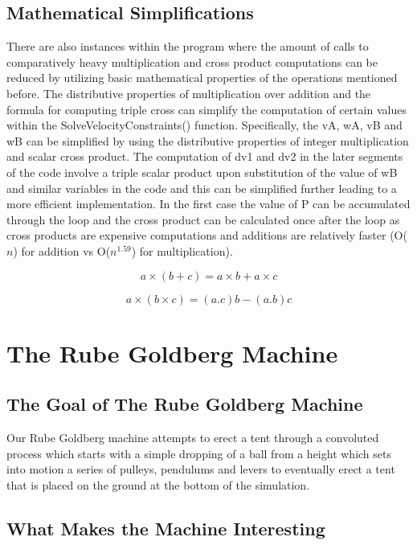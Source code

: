 \documentclass[11pt] {article}
\begin{document}
\subsection {Mathematical Simplifications}

There are also instances within the program where the amount of calls to comparatively heavy multiplication
and cross product computations can be reduced by utilizing basic mathematical properties of the operations
mentioned before. The distributive properties of multiplication over addition and the formula for computing
triple cross can simplify the computation of certain values within the SolveVelocityConstraints() function.
Specifically, the vA, wA, vB and wB can be simplified by using the distributive properties of integer
multiplication and scalar cross product. The computation of dv1 and dv2 in the later segments of the code
involve a triple scalar product upon substitution of the value of wB and similar variables in the code and
this can be simplified further leading to a more efficient implementation. In the first case the value of
P can be accumulated through the loop and the cross product can be calculated once after the loop as cross
products are expensive computations and additions are relatively faster (O($n$) for addition vs O($n^{1.59}$)
for multiplication).

\begin {equation} 
a\times(b+c) = a\times b + a \times c
\end {equation}

\begin {equation} 
a\times(b\times c) = (a.c)b - (a.b)c
\end {equation}

\section {The Rube Goldberg Machine}

\subsection {The Goal of The Rube Goldberg Machine}

Our Rube Goldberg machine attempts to erect a tent through a convoluted process which starts with a simple dropping
of a ball from a height which sets into motion a series of pulleys, pendulums and levers to eventually erect a tent
that is placed on the ground at the bottom of the simulation. 

\subsection {What Makes the Machine Interesting}
\end{document}
